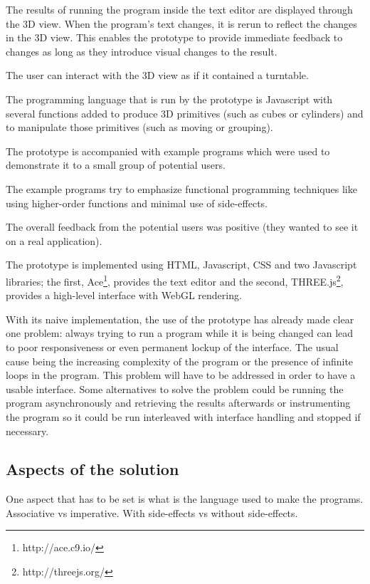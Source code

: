\documentclass{./llncs2e/llncs}
\begin{document}
	The results of running the program inside the text editor are displayed through the 3D view. 
	When the program's text changes, it is rerun to reflect the changes in the 3D view. 
	This enables the prototype to provide immediate feedback to changes as long as they introduce visual changes to the result.

	The user can interact with the 3D view as if it contained a turntable.

	The programming language that is run by the prototype is Javascript with several functions added to produce 3D primitives (such as cubes or cylinders) and to manipulate those primitives (such as moving or grouping).

	The prototype is accompanied with example programs which were used to demonstrate it to a small group of potential users.

	The example programs try to emphasize functional programming techniques like using higher-order functions and minimal use of side-effects.

	The overall feedback from the potential users was positive (they wanted to see it on a real application).

	The prototype is implemented using HTML, Javascript, CSS and two Javascript libraries; the first, Ace\footnote{http://ace.c9.io/}, provides the text editor and the second, THREE.js\footnote{http://threejs.org/}, provides a high-level interface with WebGL rendering.

	With its naive implementation, the use of the prototype has already made clear one problem: always trying to run a program while it is being changed can lead to poor responsiveness or even permanent lockup of the interface.
	The usual cause being the increasing complexity of the program or the presence of infinite loops in the program. 
	This problem will have to be addressed in order to have a usable interface. 
	Some alternatives to solve the problem could be running the program asynchronously and retrieving the results afterwards or instrumenting the program so it could be run interleaved with interface handling and stopped if necessary.

\subsection{Aspects of the solution}
	One aspect that has to be set is what is the language used to make the programs.
	Associative vs imperative. 
	With side-effects vs without side-effects.
\end{document}
